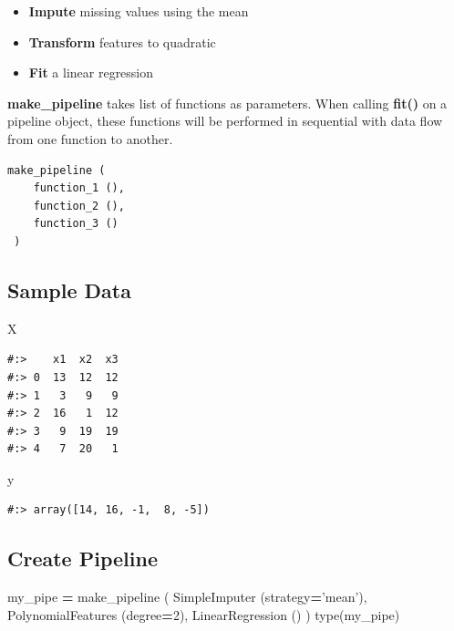 \documentclass[
]{book}
\newenvironment{Shaded}{\begin{snugshade}}{\end{snugshade}}
\newcommand{\BuiltInTok}[1]{#1}
\newcommand{\DecValTok}[1]{\textcolor[rgb]{0.06,0.06,0.06}{#1}}
\newcommand{\NormalTok}[1]{#1}
\newcommand{\OperatorTok}[1]{\textcolor[rgb]{0.43,0.43,0.43}{\textbf{#1}}}
\newcommand{\StringTok}[1]{\textcolor[rgb]{0.5,0.5,0.5}{#1}}
\providecommand{\tightlist}{%
  \setlength{\itemsep}{0pt}\setlength{\parskip}{0pt}}
\begin{document}
\begin{itemize}
\tightlist
\item
  \textbf{Impute} missing values using the mean\\
\item
  \textbf{Transform} features to quadratic\\
\item
  \textbf{Fit} a linear regression
\end{itemize}

\textbf{make\_pipeline} takes list of functions as parameters. When calling \textbf{fit()} on a pipeline object, these functions will be performed in sequential with data flow from one function to another.

\begin{verbatim}
make_pipeline (
    function_1 (),
    function_2 (),
    function_3 ()
 )
\end{verbatim}

\hypertarget{sample-data-25}{%
\subsection{Sample Data}\label{sample-data-25}}

\begin{Shaded}
\begin{Highlighting}[]
\NormalTok{X}
\end{Highlighting}
\end{Shaded}

\begin{verbatim}
#:>    x1  x2  x3
#:> 0  13  12  12
#:> 1   3   9   9
#:> 2  16   1  12
#:> 3   9  19  19
#:> 4   7  20   1
\end{verbatim}

\begin{Shaded}
\begin{Highlighting}[]
\NormalTok{y}
\end{Highlighting}
\end{Shaded}

\begin{verbatim}
#:> array([14, 16, -1,  8, -5])
\end{verbatim}

\hypertarget{create-pipeline}{%
\subsection{Create Pipeline}\label{create-pipeline}}

\begin{Shaded}
\begin{Highlighting}[]
\NormalTok{my_pipe }\OperatorTok{=}\NormalTok{ make_pipeline (}
\NormalTok{    SimpleImputer            (strategy}\OperatorTok{=}\StringTok{'mean'}\NormalTok{),}
\NormalTok{    PolynomialFeatures (degree}\OperatorTok{=}\DecValTok{2}\NormalTok{),}
\NormalTok{    LinearRegression   ()}
\NormalTok{)}
\BuiltInTok{type}\NormalTok{(my_pipe)}
\end{Highlighting}
\end{Shaded}
\end{document}

